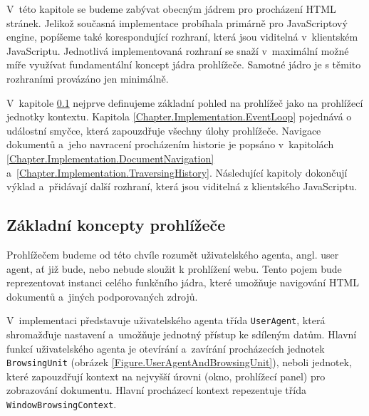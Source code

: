 V~této kapitole se budeme zabývat obecným jádrem pro procházení HTML stránek. Jelikož současná implementace probíhala primárně pro JavaScriptový engine, popíšeme také korespondující rozhraní, která jsou viditelná v~klientském JavaScriptu. Jednotlivá implementovaná rozhraní se snaží v~maximální možné míře využívat fundamentální koncept jádra prohlížeče. Samotné jádro je s těmito rozhraními provázáno jen minimálně.

V~kapitole \ref{Chapter.Implementation.BasicConcepts} nejprve definujeme základní pohled na prohlížeč jako na prohlížecí jednotky kontextu. Kapitola \ref{Chapter.Implementation.EventLoop} pojednává o událostní smyčce, která zapouzdřuje všechny úlohy prohlížeče. Navigace dokumentů a~jeho navracení procházením historie je popsáno v~kapitolách \ref{Chapter.Implementation.DocumentNavigation} a~\ref{Chapter.Implementation.TraversingHistory}. Následující kapitoly dokončují výklad a~přidávají další rozhraní, která jsou viditelná z klientského JavaScriptu. 

\subsection{Základní koncepty prohlížeče}
\label{Chapter.Implementation.BasicConcepts}

Prohlížečem budeme od této chvíle rozumět uživatelského agenta, angl. user agent, ať již bude, nebo nebude sloužit k prohlížení webu. Tento pojem bude reprezentovat instanci celého funkčního jádra, které umožňuje navigování HTML dokumentů a~jiných podporovaných zdrojů.

V~implementaci představuje uživatelského agenta třída \texttt{UserAgent}, která shromažďuje nastavení a~umožňuje jednotný přístup ke sdíleným datům. Hlavní funkcí uživatelského agenta je otevírání a~zavírání procházecích jednotek \texttt{BrowsingUnit} (obrázek \ref{Figure.UserAgentAndBrowsingUnit}), neboli jednotek, které zapouzdřují kontext na nejvyšší úrovni (okno, prohlížecí panel) pro zobrazování dokumentu. Hlavní procházecí kontext repezentuje třída \texttt{WindowBrowsingContext}.


